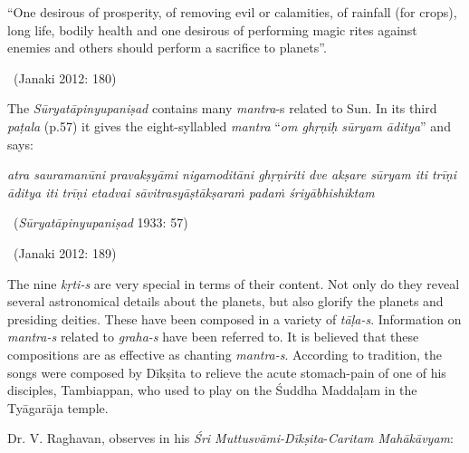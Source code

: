 \begin{myquote}
“One desirous of prosperity, of removing evil or calamities, of rainfall (for crops), long life, bodily health and one desirous of performing magic rites against enemies and others should perform a sacrifice to planets”.

~\hfill (Janaki 2012: 180)
\end{myquote}

The \textit{Sūryatāpinyupaniṣad} contains many \textit{mantra}-s related to Sun. In its third \textit{paṭala} (p.57) it gives the eight-syllabled \textit{mantra} “\textit{om ghṛṇiḥ sūryam āditya}” and says:

\begin{myquote}
\textit{atra sauramanūni pravakṣyāmi nigamoditāni  ghṛṇiriti dve akṣare  sūryam iti trīṇi  āditya iti trīṇi  etadvai sāvitrasyāṣtākṣaraṁ padaṁ śriyābhishiktam } 

~\hfill (\textit{Sūryatāpinyupaniṣad} 1933: 57)
\end{myquote}

\vspace{-.1cm}

\begin{myquote}

~\hfill (Janaki 2012: 189)
\end{myquote}

The nine \textit{kṛti-s} are very special in terms of their content. Not only do they reveal several astronomical details about the planets, but also glorify the planets and presiding deities. These have been composed in a variety of \textit{tāḷa-s}. Information on \textit{mantra-s} related to \textit{graha-s} have been referred to. It is believed that these compositions are as effective as chanting \textit{mantra-s}. According to tradition, the songs were composed by Dīkṣita to relieve the acute stomach-pain of one of his disciples, Tambiappan, who used to play on the Śuddha Maddaḷam in the Tyāgarāja temple.

Dr. V. Raghavan, observes in his \textit{Śri Muttusvāmi-Dīkṣita}-\textit{Caritam Mahā\-kāvyam}:

\vspace{-.2cm}

